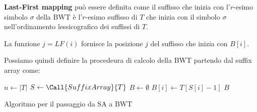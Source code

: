 \textbf{Last-First mapping} può essere definita come il suffisso che inizia con
l'$r$-esimo simbolo $\sigma$ della BWT è l'$r$-esimo suffisso di $T$ che inizia
con il simbolo $\sigma$ nell'ordinamento lessicografico dei suffissi di $T$.

La funzione $j = LF(i)$ fornisce la posizione $j$ del suffisso che inizia con $B[i]$.

Possiamo quindi definire la procedeura di calcolo della BWT partendo dal suffix
array come:
\begin{algorithm}
    \begin{algorithmic}
        \State $n \gets |T|$
        \State $S \gets \Call{SuffixArray}{T}$
        \State $B \gets \emptyset$
        \State $B[i] \gets T[S[i] - 1]$
        \EndFor
        \State \Return $B$
        \EndFunction
    \end{algorithmic}
    \caption{Algoritmo per il passaggio da SA a BWT}
\end{algorithm}
